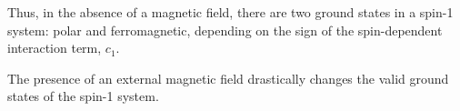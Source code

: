Thus, in the absence of a magnetic field, there are two ground states in a
spin-1 system: polar and ferromagnetic, depending on the sign of the
spin-dependent interaction term, \(c_1\).

The presence of an external magnetic field drastically changes the valid ground
states of the spin-1 system.
\begin{figure}[htb]
    \centering
\end{figure}
